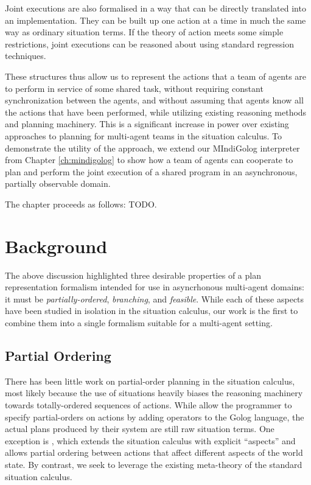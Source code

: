 Joint executions are also formalised in a way that can be directly
translated into an implementation. They can be built up one action
at a time in much the same way as ordinary situation terms. If the
theory of action meets some simple restrictions, joint executions
can be reasoned about using standard regression techniques.

These structures thus allow us to represent the actions that a team
of agents are to perform in service of some shared task, without requiring
constant synchronization between the agents, and without assuming
that agents know all the actions that have been performed, while utilizing
existing reasoning methods and planning machinery. This is a significant
increase in power over existing approaches to planning for multi-agent
teams in the situation calculus. To demonstrate the utility of the
approach, we extend our MIndiGolog interpreter from Chapter \ref{ch:mindigolog}
to show how a team of agents can cooperate to plan and perform the
joint execution of a shared program in an asynchronous, partially
observable domain.

The chapter proceeds as follows: TODO.


\section{Background\label{sec:JointExec:Background}}

The above discussion highlighted three desirable properties of a plan
representation formalism intended for use in asyncrhonous multi-agent
domains: it must be \emph{partially-ordered}, \emph{branching}, and
\emph{feasible}. While each of these aspects have been studied in
isolation in the situation calculus, our work is the first to combine
them into a single formalism suitable for a multi-agent setting.


\subsection{Partial Ordering}

There has been little work on partial-order planning in the situation
calculus, most likely because the use of situations heavily biases
the reasoning machinery towards totally-ordered sequences of actions.
While \citet{son00htn_golog} allow the programmer to specify partial-orders
on actions by adding operators to the Golog language, the actual plans
produced by their system are still raw situation terms. One exception
is \citep{plaisted97sc_aspect}, which extends the situation calculus
with explicit {}``aspects'' and allows partial ordering between
actions that affect different aspects of the world state. By contrast,
we seek to leverage the existing meta-theory of the standard situation
calculus.

